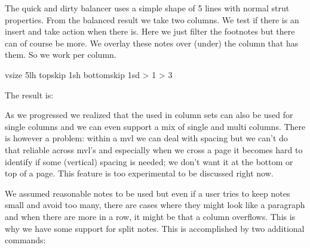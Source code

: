\typebuffer[whatever][option=TEX]

The quick and dirty balancer uses a simple shape of 5 lines with normal strut
properties. From the balanced result we take two columns. We test if there is an
insert and take action when there is. Here we just filter the footnotes but there
can of course be more. We overlay these notes over (under) the column that has
them. So we work per column.

\startbuffer[balance]
\begingroup
    \setbox\scratchboxone{}
        vsize      5lh
        topskip    1sh
        bottomskip 1sd
    \relax
    \setbox\scratchboxtwo\vbalance\scratchboxone
     \bgroup
         {
          \ifnum\currentloopiterator > 1
            \emwidth
          \fi
          \setbox\scratchboxthree\vbalancedbox\scratchboxtwo \relax
          \ifnum\boxinserts\scratchboxthree > 3
            \setbox\scratchboxfour\vbalancedinsert
                \scratchboxthree\scratchcounter
            \wd\scratchboxfour 0pt
            \box\scratchboxfour
          \fi
          \box\scratchboxthree
        }\unskip
    \egroup
\endgroup
\stopbuffer

\typebuffer[balance][option=TEX]

The result is:

\start
    \getbuffer[populate] %
    \startlinecorrection
        \getbuffer[whatever]
        \getbuffer[balance]
    \stoplinecorrection
\stop

As we progressed we realized that the  used in column sets can
also be used for single columns and we can even support a mix of single and multi
columns. There is however a problem: within a mvl we can deal with spacing but we
can't do that reliable across mvl's and especially when we cross a page it
becomes hard to identify if some (vertical) spacing is needed; we don't want it
at the bottom or top of a page. This feature is too experimental to be discussed
right now.

We assumed reasonable notes to be used but even if a user tries to keep notes
small and avoid too many, there are cases where they might look like a paragraph
and when there are more in a row, it might be that a column overflows. This is
why we have some support for split notes. This is accomplished by two additional
commands:

\starttyping[option=TEX]
\setbox\scratchboxone\vbalance\scratchboxone\relax
\vbalanceddeinsert\scratchboxone\relax
\stoptyping

